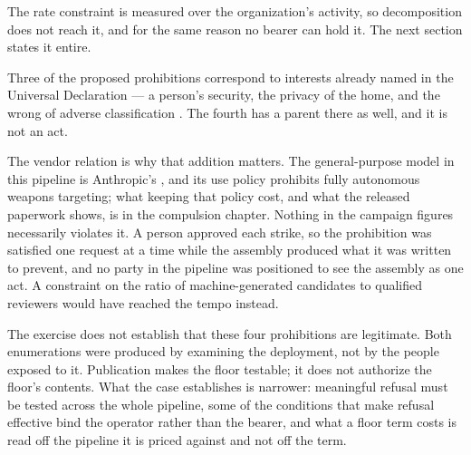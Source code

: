 The rate constraint is measured over the organization's activity, so decomposition does not reach it, and for the same reason no bearer can hold it. The next section states it entire.

Three of the proposed prohibitions correspond to interests already named in the Universal Declaration — a person's security, the privacy of the home, and the wrong of adverse classification \autocite{un1948udhr}. The fourth has a parent there as well, and it is not an act.

The vendor relation is why that addition matters. The general-purpose model in this pipeline is Anthropic's \autocite{livingstone2026maven}, and its use policy prohibits fully autonomous weapons targeting; what keeping that policy cost, and what the released paperwork shows, is in the compulsion chapter. Nothing in the campaign figures necessarily violates it. A person approved each strike, so the prohibition was satisfied one request at a time while the assembly produced what it was written to prevent, and no party in the pipeline was positioned to see the assembly as one act. A constraint on the ratio of machine-generated candidates to qualified reviewers would have reached the tempo instead.

The exercise does not establish that these four prohibitions are legitimate. Both enumerations were produced by examining the deployment, not by the people exposed to it. Publication makes the floor testable; it does not authorize the floor's contents. What the case establishes is narrower: meaningful refusal must be tested across the whole pipeline, some of the conditions that make refusal effective bind the operator rather than the bearer, and what a floor term costs is read off the pipeline it is priced against and not off the term.
